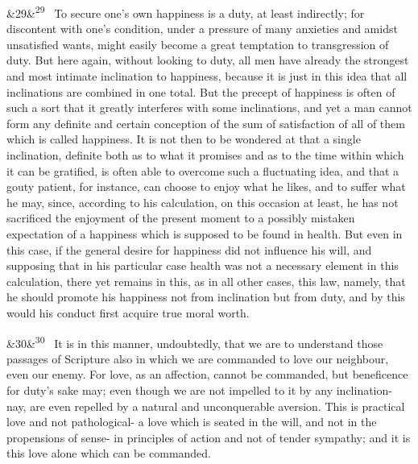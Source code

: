 \documentclass[12pt]{article}
\newcommand{\para}[1][]{\par\noindent\ifx&#1&\else\textsuperscript{\footnotesize #1}~\fi}
\begin{document}
\para[29] To secure one's own happiness is a duty, at least indirectly; for discontent with one's condition, under a pressure of many anxieties and amidst unsatisfied wants, might easily become a great temptation to transgression of duty. But here again, without looking to duty, all men have already the strongest and most intimate inclination to happiness, because it is just in this idea that all inclinations are combined in one total. But the precept of happiness is often of such a sort that it greatly interferes with some inclinations, and yet a man cannot form any definite and certain conception of the sum of satisfaction of all of them which is called happiness. It is not then to be wondered at that a single inclination, definite both as to what it promises and as to the time within which it can be gratified, is often able to overcome such a fluctuating idea, and that a gouty patient, for instance, can choose to enjoy what he likes, and to suffer what he may, since, according to his calculation, on this occasion at least, he has not sacrificed the enjoyment of the present moment to a possibly mistaken expectation of a happiness which is supposed to be found in health. But even in this case, if the general desire for happiness did not influence his will, and supposing that in his particular case health was not a necessary element in this calculation, there yet remains in this, as in all other cases, this law, namely, that he should promote his happiness not from inclination but from duty, and by this would his conduct first acquire true moral worth.

\para[30] It is in this manner, undoubtedly, that we are to understand those passages of Scripture also in which we are commanded to love our neighbour, even our enemy. For love, as an affection, cannot be commanded, but beneficence for duty's sake may; even though we are not impelled to it by any inclination- nay, are even repelled by a natural and unconquerable aversion. This is practical love and not pathological- a love which is seated in the will, and not in the propensions of sense- in principles of action and not of tender sympathy; and it is this love alone which can be commanded.
\end{document}

